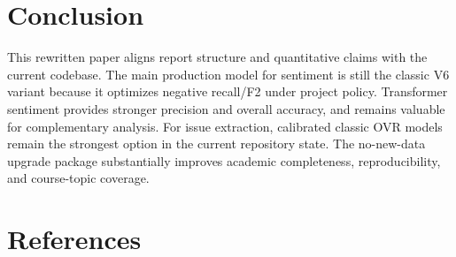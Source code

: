 \documentclass[12pt,a4paper]{article}
\begin{document}
\section{Conclusion}
This rewritten paper aligns report structure and quantitative claims with the current codebase. The main production model for sentiment is still the classic V6 variant because it optimizes negative recall/F2 under project policy. Transformer sentiment provides stronger precision and overall accuracy, and remains valuable for complementary analysis. For issue extraction, calibrated classic OVR models remain the strongest option in the current repository state. The no-new-data upgrade package substantially improves academic completeness, reproducibility, and course-topic coverage.

\clearpage
\section*{References}
\end{document}
